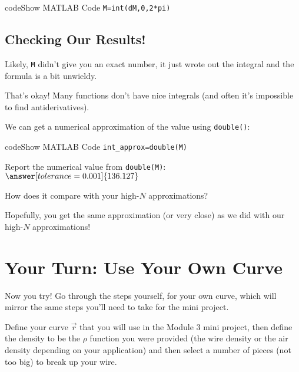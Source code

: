 \documentclass{ximera}
\begin{document}
\begin{expandable}{code}{Show MATLAB Code}
\texttt{M=int(dM,0,2*pi)}
\end{expandable}

\subsection*{Checking Our Results!}

Likely, \texttt{M} didn't give you an exact number, it just wrote out the integral and the formula is a bit unwieldy.

That's okay! Many functions don't have nice integrals (and often it's impossible to find antiderivatives).

We can get a numerical approximation of the value using \texttt{double()}:

\begin{expandable}{code}{Show MATLAB Code}
\texttt{int\_approx=double(M)}
\end{expandable}

\begin{problem}
Report the numerical value from \texttt{double(M)}: $\answer[tolerance=0.001]{136.127}$

How does it compare with your high-$N$ approximations? \begin{multipleChoice}
\end{multipleChoice}

Hopefully, you get the same approximation (or very close) as we did with our high-$N$ approximations!
\end{problem}

\section*{Your Turn: Use Your Own Curve}

Now you try! Go through the steps yourself, for your own curve, which will mirror the same steps you'll need to take for the mini project.

Define your curve $\vec{r}$ that you will use in the Module 3 mini project, then define the density to be the $\rho$ function you were provided (the wire density or the air density depending on your application) and then select a number of pieces (not too big) to break up your wire.
\end{document}
